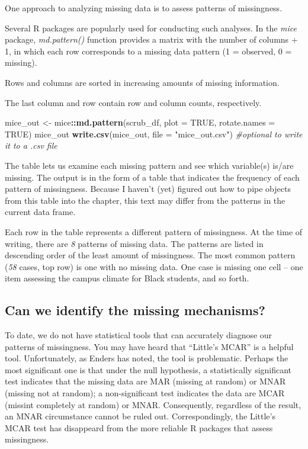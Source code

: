 \documentclass[
  11pt,
]{book}
\newenvironment{Shaded}{\begin{snugshade}}{\end{snugshade}}
\newcommand{\AttributeTok}[1]{\textcolor[rgb]{0.27,0.27,0.27}{#1}}
\newcommand{\CommentTok}[1]{\textcolor[rgb]{0.37,0.37,0.37}{\textit{#1}}}
\newcommand{\ConstantTok}[1]{\textcolor[rgb]{0.37,0.37,0.37}{#1}}
\newcommand{\FunctionTok}[1]{\textcolor[rgb]{0.27,0.27,0.27}{\textbf{#1}}}
\newcommand{\NormalTok}[1]{#1}
\newcommand{\OtherTok}[1]{\textcolor[rgb]{0.37,0.37,0.37}{#1}}
\newcommand{\SpecialCharTok}[1]{\textcolor[rgb]{0.43,0.43,0.43}{\textbf{#1}}}
\newcommand{\StringTok}[1]{\textcolor[rgb]{0.5,0.5,0.5}{#1}}
\begin{document}
One approach to analyzing missing data is to assess patterns of missingness.

Several R packages are popularly used for conducting such analyses. In the \emph{mice} package, \emph{md.pattern()} function provides a matrix with the number of columns + 1, in which each row corresponds to a missing data pattern (1 = observed, 0 = missing).

Rows and columns are sorted in increasing amounts of missing information.

The last column and row contain row and column counts, respectively.

\begin{Shaded}
\begin{Highlighting}[]
\NormalTok{mice\_out }\OtherTok{\textless{}{-}}\NormalTok{ mice}\SpecialCharTok{::}\FunctionTok{md.pattern}\NormalTok{(scrub\_df, }\AttributeTok{plot =} \ConstantTok{TRUE}\NormalTok{, }\AttributeTok{rotate.names =} \ConstantTok{TRUE}\NormalTok{)}
\NormalTok{mice\_out}
\FunctionTok{write.csv}\NormalTok{(mice\_out, }\AttributeTok{file =} \StringTok{"mice\_out.csv"}\NormalTok{)  }\CommentTok{\#optional to write it to a .csv file}
\end{Highlighting}
\end{Shaded}

The table lets us examine each missing pattern and see which variable(s) is/are missing. The output is in the form of a table that indicates the frequency of each pattern of missingness. Because I haven't (yet) figured out how to pipe objects from this table into the chapter, this text may differ from the patterns in the current data frame.

Each row in the table represents a different pattern of missingness. At the time of writing, there are \emph{8} patterns of missing data. The patterns are listed in descending order of the least amount of missingness. The most common pattern (\emph{58} cases, top row) is one with no missing data. One case is missing one cell -- one item assessing the campus climate for Black students, and so forth.

\hypertarget{can-we-identify-the-missing-mechanisms}{%
\subsection{Can we identify the missing mechanisms?}\label{can-we-identify-the-missing-mechanisms}}

To date, we do not have statistical tools that can accurately diagnose our patterns of missingness. You may have heard that ``Little's MCAR'' is a helpful tool. Unfortunately, as Enders \citeyearpar{enders_applied_2010} has noted, the tool is problematic. Perhaps the most significant one is that under the null hypothesis, a statistically significant test indicates that the missing data are MAR (missing at random) or MNAR (missing not at random); a non-significant test indicates the data are MCAR (missint completely at random) or MNAR. Consequently, regardless of the result, an MNAR circumstance cannot be ruled out. Correspondingly, the Little's MCAR test has disappeard from the more reliable R packages that assess missingness.
\end{document}
